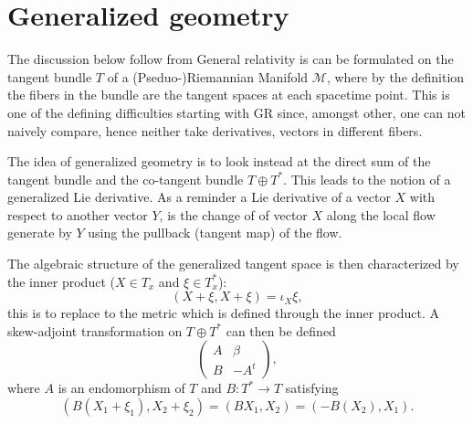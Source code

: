 \documentclass{article}
\begin{document}
\tableofcontents

\section{Generalized geometry}
The discussion below follow from \cite{Hitchin2010}
General relativity is can be formulated on the tangent bundle $T$ of a (Pseduo-)Riemannian Manifold $\mathcal{M}$, where by the definition the fibers in the bundle are the tangent spaces at each spacetime point. This is one of the defining difficulties starting with GR since, amongst other, one can not naively compare, hence neither take derivatives, vectors in different fibers. 

The idea of generalized geometry is to look instead at the direct sum of the tangent bundle and the co-tangent bundle $T\oplus T^*$. This leads to the notion of a generalized Lie derivative. As a reminder a Lie derivative of a vector $X$ with respect to another vector $Y$, is the change of of vector $X$ along the local flow generate by $Y$ using the pullback (tangent map) of the flow. 

The algebraic structure of the generalized tangent space is then characterized by the inner product ($X\in T_x$ and $\xi\in T^*_x$):
\begin{equation}
    (X+\xi,X+\xi) = \iota_X \xi,
\end{equation}
this is to replace to the metric which is defined through the inner product. A skew-adjoint transformation on $T\oplus T^*$ can then be defined 
\begin{equation}
    \begin{pmatrix}
        A & \beta \\
        B & -A^t
    \end{pmatrix},
\end{equation}
where $A$ is an endomorphism of $T$ and $B: T^*\to T$ satisfying 
\begin{equation}
    (B(X_1+\xi_1),X_2+\xi_2) = (BX_1,X_2) = (-B(X_2),X_1).
\end{equation}




\newpage


\end{document}
